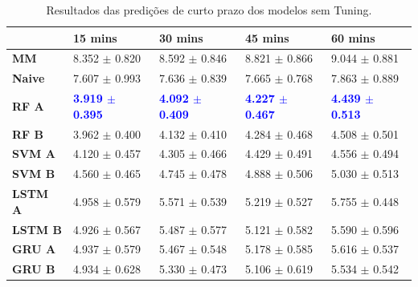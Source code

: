 \begin{table}[H]
    \begin{tabular*}{\linewidth}{@{\extracolsep{\fill}}lllll}
    \toprule
     & 
    \multicolumn{1}{l}{\textbf{15 mins}} & 
    \multicolumn{1}{l}{\textbf{30 mins}} &
    \multicolumn{1}{l}{\textbf{45 mins}} &
    \multicolumn{1}{l}{\textbf{60 mins}} \\
\midrule
\textbf{MM} & 8.352 $\pm$ 0.820 & 8.592 $\pm$ 0.846 & 8.821 $\pm$ 0.866 & 9.044 $\pm$ 0.881
\\

\midrule
\textbf{Naive} & 7.607 $\pm$ 0.993 & 7.636 $\pm$ 0.839 & 7.665 $\pm$ 0.768 & 7.863 $\pm$ 0.889
\\

\midrule
\textbf{RF A} & \textcolor{blue}{\textbf{3.919 $\pm$ 0.395}} & \textcolor{blue}{\textbf{4.092 $\pm$ 0.409}} & \textcolor{blue}{\textbf{4.227 $\pm$ 0.467}} & \textcolor{blue}{\textbf{4.439 $\pm$ 0.513}}
\\

\midrule
\textbf{RF B} & 3.962 $\pm$ 0.400 & 4.132 $\pm$ 0.410 & 4.284 $\pm$ 0.468 & 4.508 $\pm$ 0.501
\\

\midrule
\textbf{SVM A} & 4.120 $\pm$ 0.457 & 4.305 $\pm$ 0.466 & 4.429 $\pm$ 0.491 & 4.556 $\pm$ 0.494
\\

\midrule
\textbf{SVM B} & 4.560 $\pm$ 0.465 & 4.745 $\pm$ 0.478 & 4.888 $\pm$ 0.506 & 5.030 $\pm$ 0.513
\\

\midrule
\textbf{LSTM A} & 4.958 $\pm$ 0.579 & 5.571 $\pm$ 0.539 & 5.219 $\pm$ 0.527 & 5.755 $\pm$ 0.448
\\

\midrule
\textbf{LSTM B} & 4.926 $\pm$ 0.567 & 5.487 $\pm$ 0.577 & 5.121 $\pm$ 0.582 & 5.590 $\pm$ 0.596
\\

\midrule
\textbf{GRU A} & 4.937 $\pm$ 0.579 & 5.467 $\pm$ 0.548 & 5.178 $\pm$ 0.585 & 5.616 $\pm$ 0.537
\\

\midrule
\textbf{GRU B} & 4.934 $\pm$ 0.628 & 5.330 $\pm$ 0.473 & 5.106 $\pm$ 0.619 & 5.534 $\pm$ 0.542
\\
    \bottomrule
    \end{tabular*}
    \label{table:curto_prazo_no_tuning}
    \caption{Resultados das predições de curto prazo dos modelos sem Tuning.}
\end{table}

